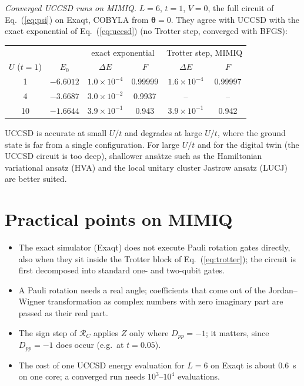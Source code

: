 \documentclass[11pt,a4paper]{article}
\begin{document}
\emph{Converged UCCSD runs on MIMIQ.} $L = 6$, $t = 1$, $V = 0$, the full
circuit of Eq.~(\ref{eq:psi}) on Exaqt, COBYLA from $\boldsymbol\theta = 0$.
They agree with UCCSD with the exact exponential of Eq.~(\ref{eq:uccsd})
(no Trotter step, converged with BFGS):
\begin{center}
\begin{tabular}{cccccc}
  \toprule
  & & \multicolumn{2}{c}{exact exponential} & \multicolumn{2}{c}{Trotter step, MIMIQ} \\
  $U$ ($t=1$) & $E_0$ & $\Delta E$ & $F$ & $\Delta E$ & $F$ \\
  \midrule
  1  & $-6.6012$ & $1.0\times10^{-4}$ & 0.99999 & $1.6\times10^{-4}$ & 0.99997 \\
  4  & $-3.6687$ & $3.0\times10^{-2}$ & 0.9937  & -- & -- \\
  10 & $-1.6644$ & $3.9\times10^{-1}$ & 0.943   & $3.9\times10^{-1}$ & 0.942 \\
  \bottomrule
\end{tabular}
\end{center}
UCCSD is accurate at small $U/t$ and degrades at large $U/t$, where the ground
state is far from a single configuration. For large $U/t$ and for the digital
twin (the UCCSD circuit is too deep), shallower ans\"atze such as the
Hamiltonian variational ansatz (HVA) and the local unitary cluster Jastrow
ansatz (LUCJ) are better suited.

\section{Practical points on MIMIQ}

\begin{itemize}
  \item The exact simulator (Exaqt) does not execute Pauli rotation gates
    directly, also when they sit inside the Trotter block of
    Eq.~(\ref{eq:trotter}); the circuit is first decomposed into standard
    one- and two-qubit gates.
  \item A Pauli rotation needs a real angle; coefficients that come out of the
    Jordan--Wigner transformation as complex numbers with zero imaginary part
    are passed as their real part.
  \item The sign step of $\mathcal{R}_C$ applies $Z$ only where $D_{pp} = -1$;
    it matters, since $D_{pp} = -1$ does occur (e.g.\ at $t = 0.05$).
  \item The cost of one UCCSD energy evaluation for $L = 6$ on Exaqt is about
    0.6~s on one core; a converged run needs $10^3$--$10^4$ evaluations.
\end{itemize}
\end{document}
